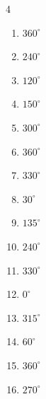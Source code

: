 \begin{multicols}{4}
\begin{enumerate}
  \item $\displaystyle 360^{\circ}$
        \phantom{$\displaystyle =2\pi$}

  \item $\displaystyle 240^{\circ}$

  \item $\displaystyle 120^{\circ}$

  \item $\displaystyle 150^{\circ}$

\columnbreak %

  \item $\displaystyle 300^{\circ}$

  \item $\displaystyle 360^{\circ}$
        \phantom{$\displaystyle =2\pi$}

  \item $\displaystyle 330^{\circ}$

  \item $\displaystyle 30^{\circ}$

  \item $\displaystyle 135^{\circ}$

  \item $\displaystyle 240^{\circ}$

  \item $\displaystyle 330^{\circ}$

  \item $\displaystyle 0^{\circ}$
        \phantom{$\displaystyle =0$}

  \item $\displaystyle 315^{\circ}$

  \item $\displaystyle 60^{\circ}$

  \item $\displaystyle 360^{\circ}$
        \phantom{$\displaystyle =2\pi$}

  \item $\displaystyle 270^{\circ}$


\end{enumerate}
\end{multicols}
